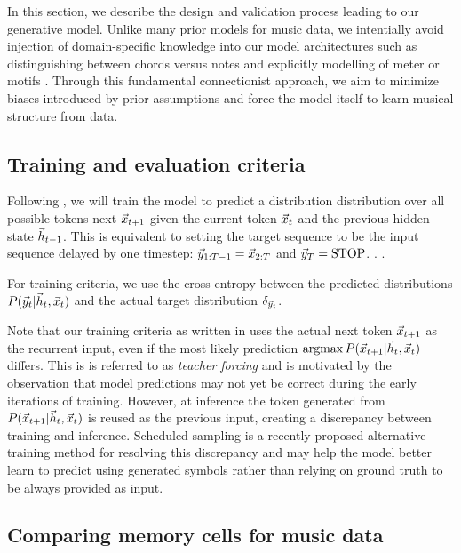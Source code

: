 In this section, we describe the design and validation process leading to our
generative model. Unlike many prior models for music data, we intentially avoid
injection of domain-specific knowledge into our model architectures such as
distinguishing between chords versus notes
\citep{hild1991harmonet}\citep{mozer1994neural} \citep{Eck2002} and explicitly
modelling of meter \citep{eck2008learning} or motifs \citep{feulner1994melonet}.
Through this fundamental connectionist approach, we aim to minimize biases
introduced by prior assumptions and force the model itself to learn musical
structure from data.

\subsection{Training and evaluation criteria}

Following \citep{mozer1994neural}, we will train the model to predict a distribution
distribution over all possible tokens next $\vec{x}_{t+1}$ given the current token
$\vec{x}_{t}$ and the previous hidden state $\vec{h}_{t-1}$. This is equivalent to
setting the target sequence to be the input sequence delayed by one timestep:
$\vec{y}_{1:T-1} = \vec{x}_{2:T}$ and $\vec{y}_T = \text{STOP}$. .
.

For training criteria, we use the cross-entropy between the predicted
distributions $P(\vec{y}_t | \vec{h}_t, \vec{x}_t)$ and the actual target distribution
$\delta_{\vec{y}_t}$.

Note that our training criteria as written in  uses the actual
next token $\vec{x}_{t+1}$ as the recurrent input, even if the most likely
prediction $\operatorname*{argmax} P(\vec{x}_{t+1} | \vec{h}_t, \vec{x}_t)$ differs. This is is referred to
as \emph{teacher forcing}\citep{williams1989learning} and is motivated by the
observation that model predictions may not yet be correct during the early
iterations of training. However, at inference the token generated from
$P(\vec{x}_{t+1} | \vec{h}_t, \vec{x}_t)$ is reused as the previous input, creating a
discrepancy between training and inference. Scheduled sampling
\citep{bengio2015scheduled} is a recently proposed alternative training method
for resolving this discrepancy and may help the model better learn to predict
using generated symbols rather than relying on ground truth to be always
provided as input.

\subsection{Comparing memory cells for music data}

